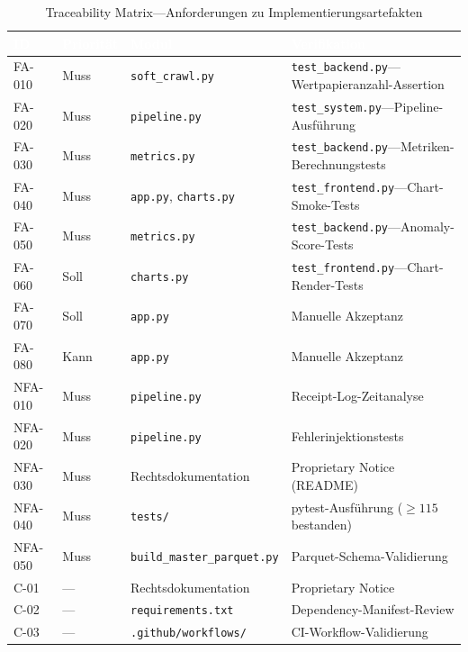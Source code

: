 \documentclass[11pt, a4paper, oneside, openany]{report}
\newcommand{\code}[1]{\texttt{\small\textcolor{DeepNavy}{#1}}}
\begin{document}
\begin{table}[H]
\centering
\caption{Traceability Matrix\;---\;Anforderungen zu Implementierungsartefakten}
\label{tab:traceability}
\sffamily\small
\begin{tabularx}{\textwidth}{l l l X}
  \toprule
  \rowcolor{DeepNavy} \textcolor{white}{\textbf{ID}} & \textcolor{white}{\textbf{Priorität}} & \textcolor{white}{\textbf{Modul}} & \textcolor{white}{\textbf{Verifikation}} \\
  \midrule
  FA-010  & Muss   & \code{soft\_crawl.py}             & \code{test\_backend.py}\;---\;Wertpapieranzahl-Assertion \\
  FA-020  & Muss   & \code{pipeline.py}                & \code{test\_system.py}\;---\;Pipeline-Ausführung \\
  FA-030  & Muss   & \code{metrics.py}                 & \code{test\_backend.py}\;---\;Metriken-Berechnungstests \\
  FA-040  & Muss   & \code{app.py}, \code{charts.py}   & \code{test\_frontend.py}\;---\;Chart-Smoke-Tests \\
  FA-050  & Muss   & \code{metrics.py}                 & \code{test\_backend.py}\;---\;Anomaly-Score-Tests \\
  FA-060  & Soll   & \code{charts.py}                  & \code{test\_frontend.py}\;---\;Chart-Render-Tests \\
  FA-070  & Soll   & \code{app.py}                     & Manuelle Akzeptanz \\
  FA-080  & Kann   & \code{app.py}                     & Manuelle Akzeptanz \\
  \midrule
  NFA-010 & Muss   & \code{pipeline.py}                & Receipt-Log-Zeitanalyse \\
  NFA-020 & Muss   & \code{pipeline.py}                & Fehlerinjektionstests \\
  NFA-030 & Muss   & Rechtsdokumentation               & Proprietary Notice (README) \\
  NFA-040 & Muss   & \code{tests/}                     & pytest-Ausführung ($\geq 115$ bestanden) \\
  NFA-050 & Muss   & \code{build\_master\_parquet.py}   & Parquet-Schema-Validierung \\
  \midrule
  C-01    & ---    & Rechtsdokumentation               & Proprietary Notice \\
  C-02    & ---    & \code{requirements.txt}           & Dependency-Manifest-Review \\
  C-03    & ---    & \code{.github/workflows/}         & CI-Workflow-Validierung \\
  \bottomrule
\end{tabularx}
\end{table}
\end{document}
